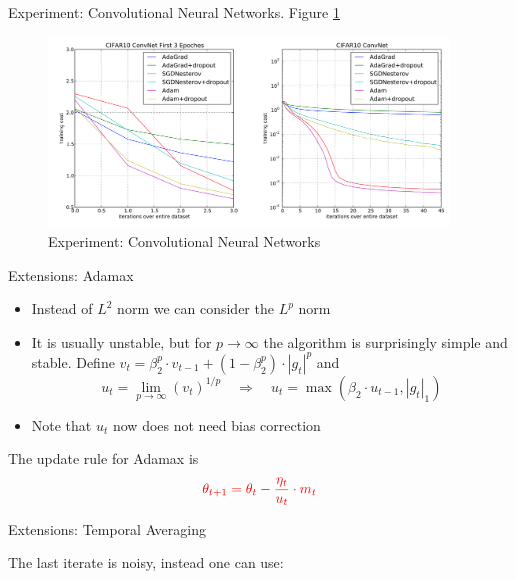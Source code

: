 \documentclass[english]{article}
\begin{document}
\item {Experiment: Convolutional Neural Networks}. Figure \ref{experiment_cnn}

\begin{figure}
 \centering
\includegraphics[width = 0.95\textwidth]{experiment_cnn.png}
\caption{Experiment: Convolutional Neural Networks}
\label{experiment_cnn}
\end{figure}










\item {Extensions: Adamax}

\begin{itemize}
\item Instead of $L^2$ norm we can consider the $L^p$ norm
\item It is usually unstable, but for $p \to \infty$ the algorithm is surprisingly simple and stable. Define $v_t = \beta_2^p\cdot v_{t-1} + (1-\beta_2^p) \cdot |g_t|^p$ and
$$u_t = \lim_{p\to\infty} (v_t)^{1/p} \quad \Rightarrow\quad u_t = \max(\beta_2 \cdot u_{t-1}, |g_t|_1)$$
\item Note that $u_t$ now does not need bias correction
\end{itemize}


The update rule for Adamax is
$$\textcolor{red}{\theta_{t+1} = \theta_t - \frac{\eta_t}{u_t} \cdot m_t}$$











\item {Extensions: Temporal Averaging}

The last iterate is noisy, instead one can use:
\end{document}
